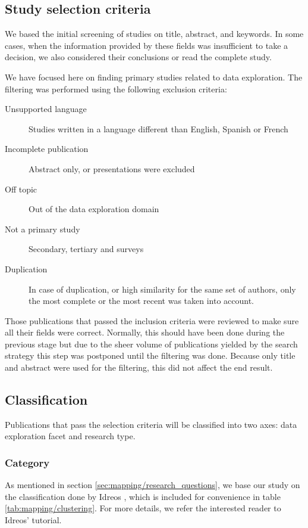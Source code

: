 \subsection{Study selection criteria}
We based the initial screening of studies on title, abstract, and keywords.
In some cases, when the information provided by these fields was
insufficient to take a decision, we also considered their conclusions
or read the complete study.

We have focused here on finding primary studies related to data exploration.
The filtering was performed using the following exclusion criteria:

\begin{description}
  \item[Unsupported language] Studies written in a language different than
  English, Spanish or French
  \item[Incomplete publication] Abstract only, or presentations were excluded
  \item[Off topic] Out of the data exploration domain
  \item[Not a primary study] Secondary, tertiary and surveys
  \item[Duplication] In case of duplication, or high similarity for the same
  set of authors, only the most complete or the most recent was
  taken into account.
\end{description}

Those publications that passed the inclusion criteria were reviewed to make
sure all their fields were correct. Normally, this should have been done during
the previous stage but due to the sheer volume of publications yielded by the
search strategy this step was postponed until the filtering was done. Because only
title and abstract were used for the filtering, this did not affect the end
result.

\subsection{Classification}
Publications that pass the selection criteria will be classified into two axes:
data exploration facet and research type.

\subsubsection{Category}
\label{sec:mapping_category}
As mentioned in section \ref{sec:mapping/research_questions}, we base our study on
the classification done by Idreos \etal \cite{Idreos2015}, which is included for
convenience in table \ref{tab:mapping/clustering}. For more details, we refer the
interested reader to Idreos' tutorial.

